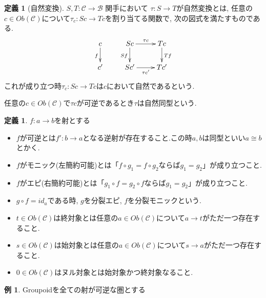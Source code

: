 \documentclass[dvipdfmx,a4paper,11pt]{article}
\theoremstyle{definition}
\newtheorem{dfn}[thm]{定義}
\newtheorem{exa}[thm]{例}
\begin{document}
 \begin{tcolorbox}
 [colback = white, colframe = green!35!black, fonttitle = \bfseries,breakable = true]
\begin{dfn}[自然変換]
$S, T :  \mathcal{C} \to \mathcal{B}$ 関手において
$\tau : S \to T$が自然変換とは, 任意の$c \in Ob(\mathcal{C})$について$\tau_c : Sc \to Tc$を割り当てる関数で, 次の図式を満たすものである.
\begin{equation*}
\xymatrix@C=25pt@R=20pt{
c\ar@{->}[d]_{f}&Sc\ar@{->}[d]_{Sf}  \ar@{->}[r]^{\tau c} & Tc\ar@{->}[d]^{Tf} \\
c'&Sc'\ar@{->}[r]_{\tau c'} & Tc'\\   
}
\end{equation*}
これが成り立つ時$\tau_c : Sc \to Tc$は$c$において自然であるという. 

任意の$c \in Ob(\mathcal{C})$で$\tau c$が可逆であるとき$\tau$は自然同型という. 
\end{dfn}
 \end{tcolorbox}


 \begin{tcolorbox}
 [colback = white, colframe = green!35!black, fonttitle = \bfseries,breakable = true]
\begin{dfn}
$f : a \to b$を射とする
\begin{itemize}
\item $f$が可逆とは$f' : b \to a$となる逆射が存在すること.この時$a,b$は同型といい$a \cong b$とかく.
\item $f$がモニック(左簡約可能)とは「$f \circ g_1 = f \circ g_2$ならば$g_1 =g_2$」が成り立つこと.
\item $f$がエピ(右簡約可能)とは「$g_1 \circ f  = g_2 \circ f $ならば$g_1 =g_2$」が成り立つこと.
\item $g \circ f = id_{a}$である時, $g$を分裂エピ, $f$を分裂モニックという. 
\item $t \in Ob(\mathcal{C})$は終対象とは任意の$a \in Ob(\mathcal{C})$について$a \to t$がただ一つ存在すること.
\item $s \in Ob(\mathcal{C})$は始対象とは任意の$a \in Ob(\mathcal{C})$について$s\to a$がただ一つ存在すること.
\item $0 \in Ob(\mathcal{C})$はヌル対象とは始対象かつ終対象なること. 
\end{itemize}
\end{dfn}
 \end{tcolorbox}

\begin{exa}
Groupoidを全ての射が可逆な圏とする
\end{exa}
\end{document}
